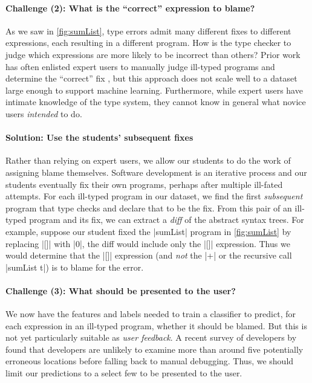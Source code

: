 \paragraph{\textbf{Challenge (2): What is the ``correct'' expression to blame?}}
As we saw in \autoref{fig:sumList}, type errors admit many different
fixes to different expressions, each resulting in a different program.
%
How is the type checker to judge which expressions are more likely to be
incorrect than others?
%
Prior work has often enlisted expert users to manually judge ill-typed
programs and determine the ``correct'' fix \citep[e.g.][]{Loncaric2016-uk}, but
this approach does not scale well to a dataset large enough to support
machine learning.
%
Furthermore, while expert users have intimate knowledge of the type system,
they cannot know in general what novice users \emph{intended} to do.

\paragraph{\textbf{Solution: Use the students' subsequent fixes}}
%
Rather than relying on expert users, we allow our students to do the
work of assigning blame themselves.
%
Software development is an iterative process and our students 
eventually fix their own programs, perhaps after multiple ill-fated
attempts.
%
For each ill-typed program in our dataset, we find the first
\emph{subsequent} program that type checks and declare that to be the
fix.
%
From this pair of an ill-typed program and its fix, we can extract a
\emph{diff} of the abstract syntax trees.
%
For example, suppose our student fixed the |sumList| program in
\autoref{fig:sumList} by replacing |[]| with |0|, the diff would include
only the |[]| expression.
%
Thus we would determine that the |[]| expression (and \emph{not} the
|+| or the recursive call |sumList t|) is to blame for the error.


\paragraph{\textbf{Challenge (3): What should be presented to the user?}}
We now have the features and labels needed to train a classifier to
predict, for each expression in an ill-typed program, whether it should
be blamed.
%
But this is not yet particularly suitable as \emph{user feedback}.
%
A recent survey of developers by \citet{Kochhar2016-oc} found that
developers are unlikely to examine more than around five potentially
erroneous locations before falling back to manual debugging.
%
Thus, we should limit our predictions to a select few to be presented to
the user.

